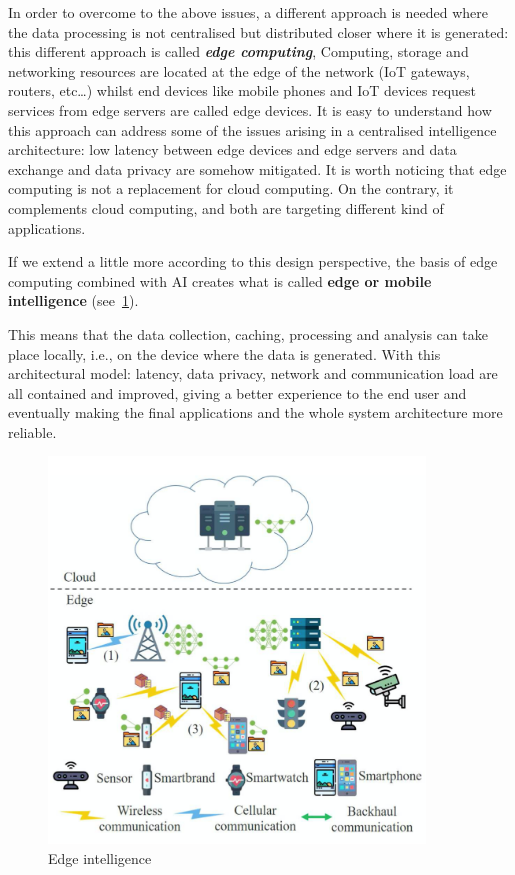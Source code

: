In order to overcome to the above issues, a different approach is needed where
the data processing is not centralised but distributed closer where it is
generated: this different approach is called \textbf{\textit{edge computing}},
Computing, storage and networking resources are located at the edge of the
network (IoT gateways, routers, etc\ldots) whilst end devices like mobile
phones and IoT devices request services from edge servers are called edge
devices.
It is easy to understand how this approach can address some of the issues
arising in a centralised intelligence architecture: low latency between edge
devices and edge servers and data exchange and data privacy are somehow
mitigated.
It is worth noticing that edge computing is not a replacement for cloud
computing. On the contrary, it complements cloud computing, and both are
targeting different kind of applications.

If we extend a little more according to this design perspective, the basis of
edge computing combined with AI creates what is called
\textbf{edge or mobile intelligence} (see~\ref{fig:edge_intelligence}).

This means that the data collection, caching, processing and analysis can take
place locally, i.e., on the device where the data is generated.
With this architectural model: latency, data privacy, network and communication
load are all contained and improved, giving a better experience to the end user
and eventually making the final applications and the whole system architecture
more reliable.

\begin{figure}[ht]
    \includegraphics[width=10cm]{images/introduction/edge_intelligence.png}
    \centering
    \caption{Edge intelligence}\label{fig:edge_intelligence}
\end{figure}

